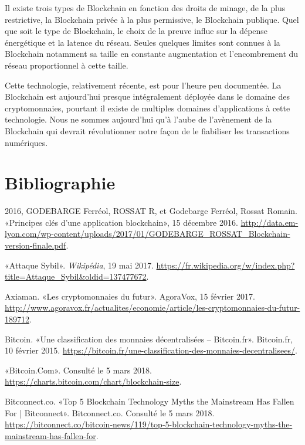 \documentclass{article}
\begin{document}
Il existe trois types de Blockchain en fonction des droits de minage, de la plus restrictive, la Blockchain privée à la plus permissive, le Blockchain publique. Quel que soit le type de Blockchain, le choix de la preuve influe sur la dépense énergétique et la latence du réseau. Seules quelques limites sont connues à la Blockchain notamment sa taille en constante augmentation et l'encombrement du réseau proportionnel à cette taille.


Cette technologie, relativement récente, est pour l'heure peu documentée. La Blockchain est aujourd'hui presque intégralement déployée dans le domaine des cryptomonnaies, pourtant il existe de multiples domaines d'applications à cette technologie. Nous ne sommes aujourd'hui qu'à l'aube de l'avènement de la Blockchain qui devrait révolutionner notre façon de le fiabiliser les transactions numériques.


\clearpage

\section*{Bibliographie}

2016, GODEBARGE Ferréol, ROSSAT R, et Godebarge Ferréol, Rossat Romain. «Principes clés d’une application blockchain», 15 décembre 2016. \url{http://data.em-lyon.com/wp-content/uploads/2017/01/GODEBARGE_ROSSAT_Blockchain-version-finale.pdf}.

«Attaque Sybil». \textit{Wikipédia}, 19 mai 2017. \url{https://fr.wikipedia.org/w/index.php?title=Attaque_Sybil&oldid=137477672}.

Axiaman. «Les cryptomonnaies du futur». AgoraVox, 15 février 2017. \url{http://www.agoravox.fr/actualites/economie/article/les-cryptomonnaies-du-futur-189712}.

Bitcoin. «Une classification des monnaies décentralisées – Bitcoin.fr». Bitcoin.fr, 10 février 2015. \url{https://bitcoin.fr/une-classification-des-monnaies-decentralisees/}.

«Bitcoin.Com». Consulté le 5 mars 2018. \url{https://charts.bitcoin.com/chart/blockchain-size}.

Bitconnect.co. «Top 5 Blockchain Technology Myths the Mainstream Has Fallen For | Bitconnect». Bitconnect.co. Consulté le 5 mars 2018. \url{https://bitconnect.co/bitcoin-news/119/top-5-blockchain-technology-myths-the-mainstream-has-fallen-for}.
\end{document}
